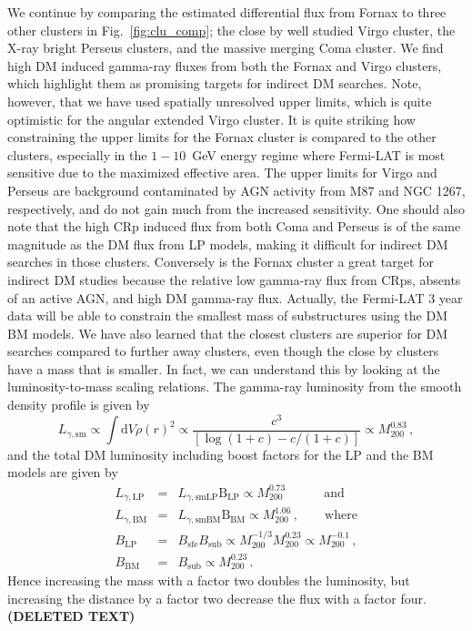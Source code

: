 \documentclass[10pt,aps,pra,reprint,amsmath,amsfonts,amssymb,showpacs]{revtex4-1}
\def\del#1{{\bf (DELETED TEXT)}}
\newcommand{\rmn}{\mathrm}
\newcommand{\sfe}{\rmn{sfe}}
\newcommand{\sub}{\rmn{sub}}
\newcommand{\msun}{M_\odot}
\newcommand{\B}{\rmn{B}}
\newcommand{\dd}{\rmn{d}}
\newcommand{\mvir}{M_{200}}
\begin{document}
We continue by comparing the estimated differential flux from Fornax
to three other clusters in Fig.~\ref{fig:clu_comp}; the close by well
studied Virgo cluster, the X-ray bright Perseus clusters, and the
massive merging Coma cluster. We find high DM induced gamma-ray fluxes
from both the Fornax and Virgo clusters, which highlight them as
promising targets for indirect DM searches. Note, however, that we
have used spatially unresolved upper limits, which is quite optimistic
for the angular extended Virgo cluster. It is quite striking how
constraining the upper limits for the Fornax cluster is compared to
the other clusters, especially in the $1-10$~GeV energy regime where
Fermi-LAT is most sensitive due to the maximized effective area. The
upper limits for Virgo and Perseus are background contaminated by AGN
activity from M87 and NGC 1267, respectively, and do not gain much
from the increased sensitivity. One should also note that the high CRp
induced flux from both Coma and Perseus is of the same magnitude as
the DM flux from LP models, making it difficult for indirect DM
searches in those clusters. Conversely is the Fornax cluster a great
target for indirect DM studies because the relative low gamma-ray flux
from CRps, absents of an active AGN, and high DM gamma-ray
flux. Actually, the Fermi-LAT 3 year data will be able to constrain
the smallest mass of substructures using the DM BM models. We have
also learned that the closest clusters are superior for DM searches
compared to further away clusters, even though the close by clusters
have a mass that is smaller. In fact, we can understand this by
looking at the luminosity-to-mass scaling relations. The gamma-ray
luminosity from the smooth density profile is given by
\begin{equation}
L_{\gamma,\rmn{sm}} \propto \int \dd V \rho(r)^2 \propto \frac{c^3}
{\left[\log\left(1+c\right)-c/(1+c)\right]} \propto \mvir^{0.83}\,,
\end{equation}
and the total DM luminosity including boost factors for the LP and
the BM models are given by
\begin{eqnarray}
L_{\gamma,\rmn{LP}} &=& L_{\gamma,\rmn{smLP}} \B_\rmn{LP} \propto \mvir^{0.73}\qquad
\,\,\,\,\,\,\rmn{and}\\
L_{\gamma,\rmn{BM}} &=& L_{\gamma,\rmn{smBM}} \B_\rmn{BM} \propto  \mvir^{1.06}\,,\qquad
\rmn{where} \\
B_\rmn{LP}&=&B_\sfe B_\sub \propto \mvir^{-1/3}\mvir^{0.23} \propto
 \mvir^{-0.1}\,,\\
B_\rmn{BM}&=&B_\sub \propto \mvir^{0.23}\,.
\end{eqnarray}
Hence increasing the mass with a factor two doubles the luminosity,
but increasing the distance by a factor two decrease the flux with a
factor four.
\del{
\begin{eqnarray}
L_{\gamma,\rmn{sub tot}} \propto N\,L_{\gamma,\sub} \propto N\,M_\sub 
 \propto M_\sub^{\left(A+1\right)}\,\frac{\dd N_\sub}{\dd M} \propto  M^{A-0.9}
\end{eqnarray}
Assuming that the concentration $c$ decrease for increasing mass as it
does for the mass range $10^{12}-10^{14}\,\msun$ where
$L_{\gamma,\sub} \propto N\,M_\sub^A$, where $A<1$.
}
\end{document}

